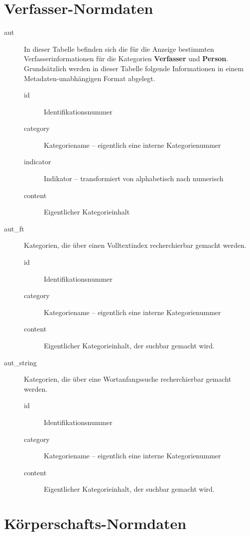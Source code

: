 \documentclass[11pt, twoside, a4paper, BCOR8mm, DIV12, bibtotoc,idxtotoc]{scrbook}
\begin{document}
\section{Verfasser-Normdaten}

\begin{description}
\item[aut] In dieser Tabelle befinden sich die für die Anzeige
  bestimmten Verfasserinformationen für die Kategorien
  \textbf{Verfasser} und \textbf{Person}. Grundsätzlich werden in
  dieser Tabelle folgende Informationen in einem
  Metadaten-unabhängigen Format abgelegt.
  \begin{description}
  \item[id] Identifikationsnummer
  \item[category] Kategoriename -- eigentlich eine interne Kategorienummer
  \item[indicator] Indikator -- transformiert von alphabetisch nach numerisch
  \item[content] Eigentlicher Kategorieinhalt
  \end{description}
\item[aut\_ft] Kategorien, die über einen Volltextindex recherchierbar
  gemacht werden.
  \begin{description}
  \item[id] Identifikationsnummer
  \item[category] Kategoriename -- eigentlich eine interne Kategorienummer
  \item[content] Eigentlicher Kategorieinhalt, der suchbar gemacht wird.
  \end{description}
\item[aut\_string] Kategorien, die über eine Wortanfangssuche
  recherchierbar gemacht werden.
  \begin{description}
  \item[id] Identifikationsnummer
  \item[category] Kategoriename -- eigentlich eine interne Kategorienummer
  \item[content] Eigentlicher Kategorieinhalt, der suchbar gemacht wird.
  \end{description}
\end{description}

\section{Körperschafts-Normdaten}
\end{document}
